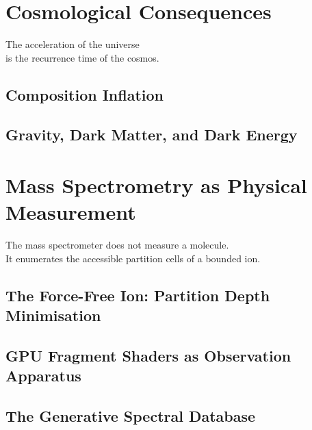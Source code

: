 \documentclass[12pt, twoside, openright]{book}
\theoremstyle{definition}
\theoremstyle{remark}
\begin{document}
\part{Cosmological Consequences}
\label{part:cosmology}

\epigraph{%
  The acceleration of the universe\\
  is the recurrence time of the cosmos.%
}{}

\chapter{Composition Inflation}
\label{ch:inflation}


\chapter{Gravity, Dark Matter, and Dark Energy}
\label{ch:gravity}


\part{Mass Spectrometry as Physical Measurement}
\label{part:instrument}

\epigraph{%
  The mass spectrometer does not measure a molecule.\\
  It enumerates the accessible partition cells of a bounded ion.%
}{}

\chapter{The Force-Free Ion: Partition Depth Minimisation}
\label{ch:forcefree}


\chapter{GPU Fragment Shaders as Observation Apparatus}
\label{ch:gpu}


\chapter{The Generative Spectral Database}
\label{ch:database}

\end{document}
